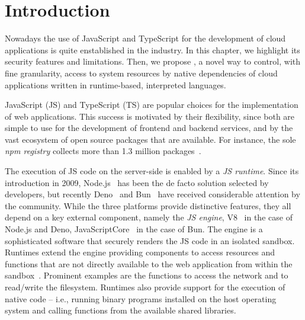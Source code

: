 \section{Introduction}
\label{sect:introduction}

Nowadays the use of JavaScript and TypeScript for the development of
cloud applications is quite enstablished in the industry. In this
chapter, we highlight its security features and limitations. Then, we
propose \natisand, a novel way to control, with fine granularity,
access to system resources by native dependencies of cloud
applications written in runtime-based, interpreted languages.


JavaScript (JS) and TypeScript (TS) are popular choices for the
implementation of web applications. This success is motivated by their
flexibility, since both are simple to use for the development of
frontend and backend services, and by the vast ecosystem of open
source packages that are available. For instance, the sole {\em npm
  registry} collects more than 1.3 million
packages~\cite{npm-registry}.

The execution of JS code on the server-side is enabled by a {\em JS
  runtime}.  Since its introduction in 2009, Node.js~\cite{node} has
been the de facto solution selected by developers, but recently
Deno~\cite{deno} and Bun~\cite{bun} have received considerable
attention by the community. While the three platforms provide
distinctive features, they all depend on a key external component,
namely the {\em JS engine}, V8~\cite{v8-site} in the
case of Node.js and Deno, JavaScriptCore~\cite{javascriptcore} in the
case of Bun. The engine is a sophisticated software that securely
renders the JS code in an isolated sandbox. Runtimes extend the engine
providing components to access resources and functions that are not
directly available to the web application from within the
sandbox~\cite{node-api, deno-api}. Prominent examples are the
functions to access the network and to read/write the
filesystem. Runtimes also provide support for the execution of native
code -- i.e., running binary programs installed on the host operating
system and calling functions from the available shared libraries.

